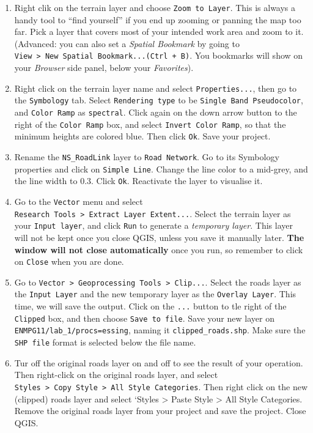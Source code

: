 \documentclass[
]{book}
\begin{document}
\begin{enumerate}
\def\labelenumi{\arabic{enumi}.}
\setcounter{enumi}{3}
\item
  Right clik on the terrain layer and choose \texttt{Zoom\ to\ Layer}. This is always a handy tool to ``find yourself'' if you end up zooming or panning the map too far. Pick a layer that covers most of your intended work area and zoom to it. (Advanced: you can also set a \emph{Spatial Bookmark} by going to \texttt{View\ \textgreater{}\ New\ Spatial\ Bookmark...(Ctrl\ +\ B)}. You bookmarks will show on your \emph{Browser} side panel, below your \emph{Favorites}).
\item
  Right click on the terrain layer name and select \texttt{Properties...}, then go to the \texttt{Symbology} tab. Select \texttt{Rendering\ type} to be \texttt{Single\ Band\ Pseudocolor}, and \texttt{Color\ Ramp} as \texttt{spectral}. Click again on the down arrow button to the right of the \texttt{Color\ Ramp} box, and select \texttt{Invert\ Color\ Ramp}, so that the minimum heights are colored blue. Then click \texttt{Ok}. Save your project.
\item
  Rename the \texttt{NS\_RoadLink} layer to \texttt{Road\ Network}. Go to its Symbology properties and click on \texttt{Simple\ Line}. Change the line color to a mid-grey, and the line width to 0.3. Click \texttt{Ok}. Reactivate the layer to visualise it.
\item
  Go to the \texttt{Vector} menu and select \texttt{Research\ Tools\ \textgreater{}\ Extract\ Layer\ Extent...}. Select the terrain layer as your \texttt{Input\ layer}, and click \texttt{Run} to generate a \emph{temporary layer}. This layer will not be kept once you close QGIS, unless you save it manually later. \textbf{The window will not close automatically} once you run, so remember to click on \texttt{Close} when you are done.
\item
  Go to \texttt{Vector\ \textgreater{}\ Geoprocessing\ Tools\ \textgreater{}\ Clip...}. Select the roads layer as the \texttt{Input\ Layer} and the new temporary layer as the \texttt{Overlay\ Layer}. This time, we will save the output. Click on the \texttt{...} button to tle right of the \texttt{Clipped} box, and then choose \texttt{Save\ to\ file}. Save your new layer on \texttt{ENMPG11/lab\_1/procs=essing}, naming it \texttt{clipped\_roads.shp}. Make sure the \texttt{SHP\ file} format is selected below the file name.
\item
  Tur off the original roads layer on and off to see the result of your operation. Then right-click on the original roads layer, and select \texttt{Styles\ \textgreater{}\ Copy\ Style\ \textgreater{}\ All\ Style\ Categories}. Then right click on the new (clipped) roads layer and select `Styles \textgreater{} Paste Style \textgreater{} All Style Categories. Remove the original roads layer from your project and save the project. Close QGIS.

\end{enumerate}
\end{document}
